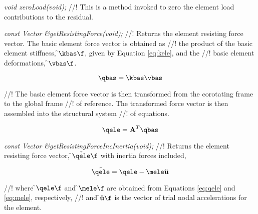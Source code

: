 {\em void zeroLoad(void);}
//! This is a method invoked to zero the element load contributions to the residual. 

{\em const Vector \&getResistingForce(void);}
//! Returns the element resisting force vector.  The basic element force vector is obtained as
//! the product of the basic element stiffness, \f$\kbas\f$, given by Equation \ref{eq:kele}, and the
//! basic element deformations, \f$\vbas\f$.

\begin{equation}
\qbas = \kbas \vbas
\end{equation}

//! The basic element force vector is then transformed from the corotating frame to the global frame
//! of reference.  The transformed force vector is then assembled into the structural system
//! of equations.

\begin{equation}
\label{eq:qele}
\qele = \mathbf{A}^T \qbas
\end{equation}

{\em const Vector \&getResistingForceIncInertia(void);}
//! Returns the element resisting force vector, \f$\tilde{\qele}\f$ with inertia forces included,

\begin{equation}
\tilde{\qele} = \qele - \mele \ddot{\mathbf u}
\end{equation}

//! where \f$\qele\f$ and \f$\mele\f$ are obtained from Equations \ref{eq:qele} and \ref{eq:mele}, respectively,
//! and \f$\ddot{\mathbf u}\f$ is the vector of trial nodal accelerations for the element.
